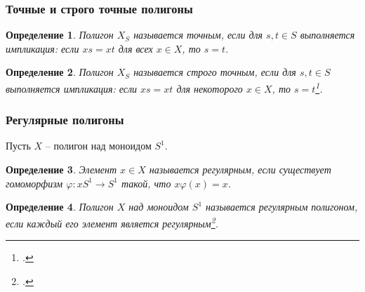 \documentclass[11pt, notheorems]{beamer}
\newtheorem{definition}{Определение}
\begin{document}
\begin{frame}
	\frametitle{Точные и строго точные полигоны}


	\begin{definition}
		Полигон $X_S$ называется \textit{точным}, если для $s,t \in S$ выполняется импликация: если $xs = xt$ для всех $x \in X$, то $s = t$.
	\end{definition}

	\begin{definition}
		Полигон $X_S$ называется \textit{строго точным}, если для $s, t \in S$ выполняется импликация: если $xs = xt$ для некоторого $x \in X$, то $s = t$\footcite[определение I.4.8]{kilp}.
	\end{definition}

\end{frame}

\begin{frame}
	\frametitle{Регулярные полигоны}

	Пусть $X$ -- полигон над моноидом $S^1$.

	\begin{definition}
		Элемент $x \in X$ называется \textit{регулярным}, если существует гомоморфизм $\varphi: xS^1 \rightarrow S^1$ такой, что $x \varphi(x) = x$.
	\end{definition}

	\begin{definition}
		Полигон $X$ над моноидом $S^1$ называется \textit{регулярным} полигоном, если каждый его элемент является регулярным\footcite[определение III.19.1]{kilp}.
	\end{definition}
\end{frame}
\end{document}

